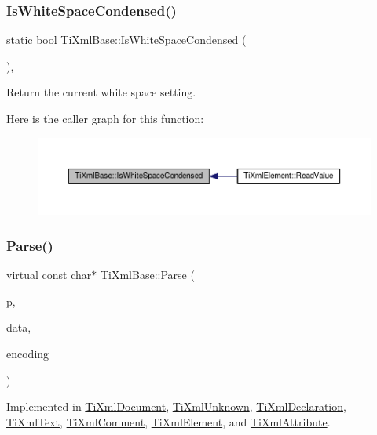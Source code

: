 \subsubsection{\texorpdfstring{Is\+White\+Space\+Condensed()}{IsWhiteSpaceCondensed()}}
{\footnotesize\ttfamily static bool Ti\+Xml\+Base\+::\+Is\+White\+Space\+Condensed (\begin{DoxyParamCaption}{ }\end{DoxyParamCaption})\hspace{0.3cm}{\ttfamily [inline]}, {\ttfamily [static]}}



Return the current white space setting. 

Here is the caller graph for this function\+:
\nopagebreak
\begin{figure}[H]
\begin{center}
\leavevmode
\includegraphics[width=350pt]{class_ti_xml_base_ad4b1472531c647a25b1840a87ae42438_icgraph}
\end{center}
\end{figure}
\mbox{\label{class_ti_xml_base_a00e4edb0219d00a1379c856e5a1d2025}} 
\subsubsection{\texorpdfstring{Parse()}{Parse()}}
{\footnotesize\ttfamily virtual const char$\ast$ Ti\+Xml\+Base\+::\+Parse (\begin{DoxyParamCaption}\item[{const char $\ast$}]{p,  }\item[{\hyperlink{class_ti_xml_parsing_data}{Ti\+Xml\+Parsing\+Data} $\ast$}]{data,  }\item[{\hyperlink{tinyxml_8h_a88d51847a13ee0f4b4d320d03d2c4d96}{Ti\+Xml\+Encoding}}]{encoding }\end{DoxyParamCaption})\hspace{0.3cm}{\ttfamily [pure virtual]}}



Implemented in \hyperlink{class_ti_xml_document_a789ad2f06f93d52bdb5570b2f3670289}{Ti\+Xml\+Document}, \hyperlink{class_ti_xml_unknown_aa51c2694e4177b5f0b5429ee5a81b58d}{Ti\+Xml\+Unknown}, \hyperlink{class_ti_xml_declaration_a9839ea97ed687a2b7342fd7b0f04361b}{Ti\+Xml\+Declaration}, \hyperlink{class_ti_xml_text_a8d2dcfa41fc73d3e62dacc2fcf633819}{Ti\+Xml\+Text}, \hyperlink{class_ti_xml_comment_a43bddc18ac057734b41d84653b71d3e0}{Ti\+Xml\+Comment}, \hyperlink{class_ti_xml_element_af95c9165159fd9dfdcc5b894a3fcf85b}{Ti\+Xml\+Element}, and \hyperlink{class_ti_xml_attribute_ad62774421b814894b995af3b5d231dda}{Ti\+Xml\+Attribute}.

